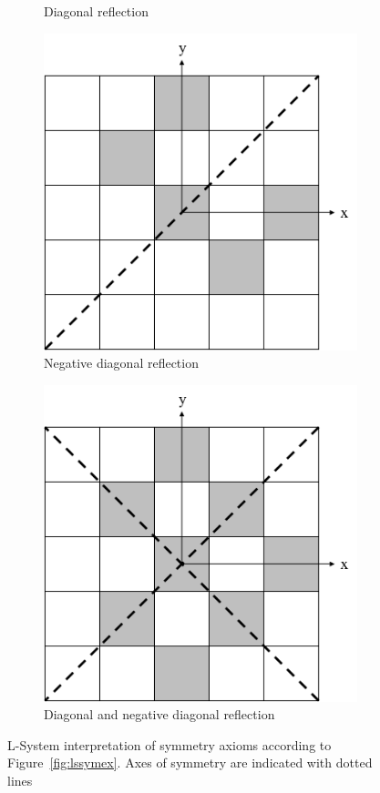 \begin{figure}[H]
\begin{subfigure}[t]{0.3\textwidth}
		\caption{Diagonal reflection}
	\end{subfigure}
	\hfill
	\begin{subfigure}[t]{0.3\textwidth}
		\centering
		\includegraphics[width=\textwidth]{LSSymRefND.png}
		\caption{Negative diagonal reflection}
	\end{subfigure}
	\hfill
	\begin{subfigure}[t]{0.3\textwidth}
		\centering
		\includegraphics[width=\textwidth]{LSSymRefDND.png}
		\caption{Diagonal and negative diagonal reflection}
	\end{subfigure}
	\caption{L-System interpretation of symmetry axioms according to Figure~\ref{fig:lssymex}. Axes of symmetry are indicated with dotted lines}
	\label{fig:lssym}
\end{figure}

